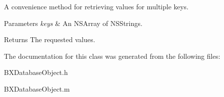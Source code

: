 A convenience method for retrieving values for multiple keys. 


\begin{DoxyParams}{Parameters}
{\em keys} & An N\+S\+Array of N\+S\+Strings. \\
\hline
\end{DoxyParams}
\begin{DoxyReturn}{Returns}
The requested values. 
\end{DoxyReturn}


The documentation for this class was generated from the following files\+:\begin{DoxyCompactItemize}
\item 
B\+X\+Database\+Object.\+h\item 
B\+X\+Database\+Object.\+m\end{DoxyCompactItemize}
